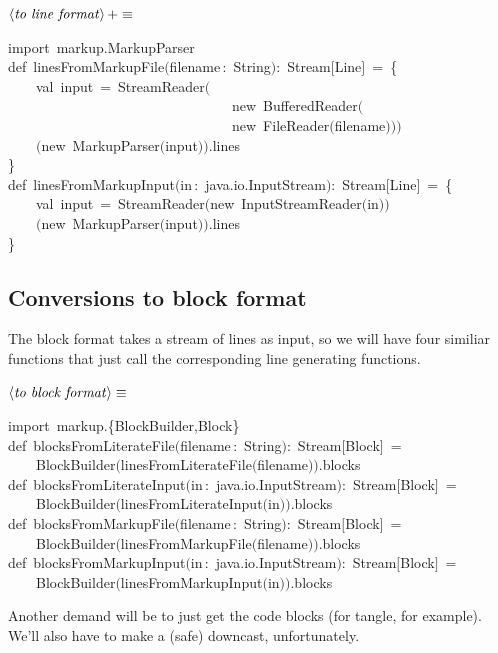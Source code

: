 \documentclass[a4paper,12pt]{article}
\begin{document}
$\left<\mbox{\emph{to line format}}\right>+\equiv$
\begin{program}{\vem import}~markup.MarkupParser
\\{\vem def}~linesFromMarkupFile$($filename\,{\rm :}~String$)${\rm :}~Stream$[$Line$]$~=~{\small\{}
\\~~~~{\vem val}~input~=~StreamReader$($
\\~~~~~~~~~~~~~~~~~~~~~~~~~~~~~~~~{\vem new}~BufferedReader$($
\\~~~~~~~~~~~~~~~~~~~~~~~~~~~~~~~~{\vem new}~FileReader$($filename$)$$)$$)$
\\[0.5em]~~~~$(${\vem new}~MarkupParser$($input$)$$)$.lines
\\{\small\}}
\\[0.5em]{\vem def}~linesFromMarkupInput$($in\,{\rm :}~java.io.InputStream$)${\rm :}~Stream$[$Line$]$~=~{\small\{}
\\~~~~{\vem val}~input~=~StreamReader$(${\vem new}~InputStreamReader$($in$)$$)$
\\~~~~$(${\vem new}~MarkupParser$($input$)$$)$.lines
\\{\small\}}
\\[0.5em]
\end{program}
\subsection{Conversions to block format}
The block format takes a stream of lines as input, so we will have four similiar functions
that just call the corresponding line generating functions.

$\left<\mbox{\emph{to block format}}\right>\equiv$
\begin{program}{\vem import}~markup.{\small\{}BlockBuilder,Block{\small\}}
\\{\vem def}~blocksFromLiterateFile$($filename\,{\rm :}~String$)${\rm :}~Stream$[$Block$]$~=
\\~~~~BlockBuilder$($linesFromLiterateFile$($filename$)$$)$.blocks
\\[0.5em]{\vem def}~blocksFromLiterateInput$($in\,{\rm :}~java.io.InputStream$)${\rm :}~Stream$[$Block$]$~=
\\~~~~BlockBuilder$($linesFromLiterateInput$($in$)$$)$.blocks
\\[0.5em]{\vem def}~blocksFromMarkupFile$($filename\,{\rm :}~String$)${\rm :}~Stream$[$Block$]$~=
\\~~~~BlockBuilder$($linesFromMarkupFile$($filename$)$$)$.blocks
\\[0.5em]{\vem def}~blocksFromMarkupInput$($in\,{\rm :}~java.io.InputStream$)${\rm :}~Stream$[$Block$]$~=
\\~~~~BlockBuilder$($linesFromMarkupInput$($in$)$$)$.blocks
\\[0.5em]\end{program}
Another demand will be to just get the code blocks (for tangle, for example).
We'll also have to make a (safe) downcast, unfortunately.
\end{document}
